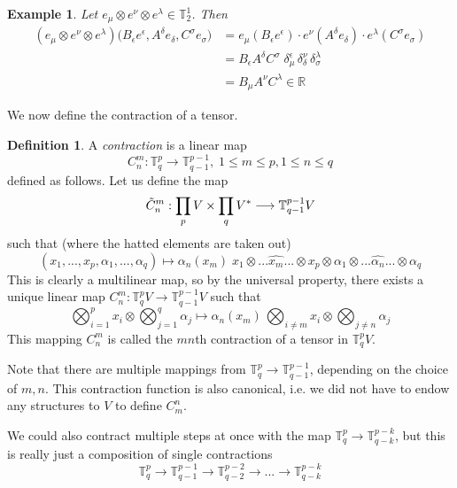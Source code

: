 \documentclass{article}
\newtheorem{example}{Example}[section]
\theoremstyle{remark}
\theoremstyle{definition}
\newtheorem{definition}{Definition}[section]
\begin{document}
    \begin{example}
    Let $e_{\mu} \otimes e^{\nu} \otimes e^{\lambda} \in \mathbb{T}^{1}_{2}$. Then 
    \begin{align*}
    (e_{\mu} \otimes e^{\nu} \otimes e^{\lambda}) \big( B_{\epsilon} e ^{\epsilon}, A^{\delta} e_{\delta}, C^{\sigma} e_{\sigma} \big) & = e_{\mu} (B_{\epsilon} e^{\epsilon}) \cdot e^{\nu} (A^{\delta} e_{\delta}) \cdot e^{\lambda} (C^\sigma e_{\sigma}) \\
     & = B_{\epsilon} A^{\delta} C^{\sigma} \; \delta_{\mu}^{\epsilon} \, \delta_{\delta}^{\nu} \, \delta_{\sigma}^{\lambda} \\
     & = B_{\mu} A^{\nu} C^{\lambda} \in \mathbb{R} 
     \end{align*}
    \end{example}

    We now define the contraction of a tensor. 

    \begin{definition}
    A \textit{contraction} is a linear map
    \[C^m_n: \mathbb{T}^p_q \longrightarrow \mathbb{T}^{p-1}_{q-1}, \; 1 \leq m \leq p, 1 \leq n \leq q\]
    defined as follows. Let us define the map 
    \[\Tilde{C}^m_n: \prod_{p} V \times \prod_q V^* \longrightarrow \mathbb{T}^{p-1}_{q-1} V\]
    such that (where the hatted elements are taken out)
    \[ (x_1, ..., x_p, \alpha_1, ..., \alpha_q) \mapsto \alpha_n (x_m) \; x_1 \otimes ... \hat{x_m} ... \otimes x_p \otimes \alpha_1 \otimes ... \hat{\alpha_n} ... \otimes \alpha_q\]
    This is clearly a multilinear map, so by the universal property, there exists a unique linear map $C^m_n: \mathbb{T}^p_q V \longrightarrow \mathbb{T}^{p-1}_{q-1} V$ such that 
    \[ \bigotimes_{i=1}^p x_i \otimes \bigotimes_{j=1}^q \alpha_j \mapsto \alpha_n (x_m) \, \bigotimes_{i \neq m} x_i \otimes \bigotimes_{j \neq n} \alpha_j\]
    This mapping $C^m_n$ is called the $m n$th contraction of a tensor in $\mathbb{T}^p_q V$. 
    \end{definition}

    Note that there are multiple mappings from $\mathbb{T}^p_q \longrightarrow \mathbb{T}^{p-1}_{q-1}$, depending on the choice of $m, n$. This contraction function is also canonical, i.e. we did not have to endow any structures to $V$ to define $C^n_m$. 

    We could also contract multiple steps at once with the map $\mathbb{T}^p_q \longrightarrow \mathbb{T}^{p-k}_{q-k}$, but this is really just a composition of single contractions 
    \[\mathbb{T}^p_q \longrightarrow \mathbb{T}^{p-1}_{q-1} \longrightarrow \mathbb{T}^{p-2}_{q-2} \longrightarrow ... \longrightarrow \mathbb{T}^{p-k}_{q-k} \]
\end{document}
